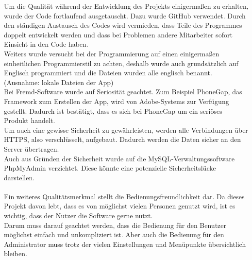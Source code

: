 Um die Qualität während der Entwicklung des Projekts einigermaßen zu erhalten, wurde der Code fortlaufend ausgetauscht. Dazu wurde GitHub verwendet. Durch den ständigen Austausch des Codes wird vermieden, dass Teile des Programmes doppelt entwickelt werden und dass bei Problemen andere Mitarbeiter sofort Einsicht in den Code haben.\\
Weiters wurde versucht bei der Programmierung auf einen einigermaßen einheitlichen Programmierstil zu achten, deshalb wurde auch grundsätzlich auf Englisch programmiert und die Dateien wurden alle englisch benannt. (Ausnahme: lokale Dateien der App)\\
Bei Fremd-Software wurde auf Seriosität geachtet. Zum Beispiel PhoneGap, das Framework zum Erstellen der App, wird von Adobe-Systems zur Verfügung gestellt. Dadurch ist bestätigt, dass es sich bei PhoneGap um ein seriöses Produkt handelt.\\
Um auch eine gewisse Sicherheit zu gewährleisten, werden alle Verbindungen über HTTPS, also verschlüsselt, aufgebaut. Dadurch werden die Daten sicher an den Server übertragen.\\
Auch aus Gründen der Sicherheit wurde auf die MySQL-Verwaltungssoftware PhpMyAdmin verzichtet. Diese könnte eine potenzielle Sicherheitslücke darstellen.\\
\\
Ein weiteres Qualitätsmerkmal stellt die Bedienungsfreundlichkeit dar. Da dieses Projekt davon lebt, dass es von möglichst vielen Personen genutzt wird, ist es wichtig, dass der Nutzer die Software gerne nutzt.\\
Darum muss darauf geachtet werden, dass die Bedienung für den Benutzer möglichst einfach und unkompliziert ist.
Aber auch die Bedienung für den Administrator muss trotz der vielen Einstellungen und Menüpunkte übersichtlich bleiben.\\
 
